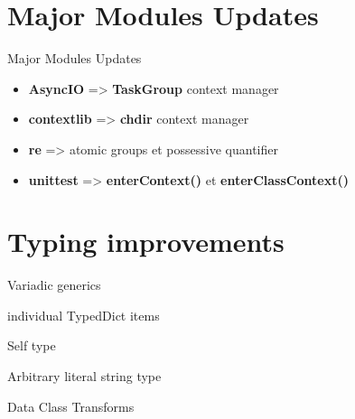 \documentclass[aspectratio=169, xetex, 12pt]{beamer}
\begin{document}
    \section{Major Modules Updates}
    \begin{frame}{Major Modules Updates}
        \begin{block}{}
            \begin{itemize}
                \item \textbf{AsyncIO} => \textbf{TaskGroup} context manager
                \item \textbf{contextlib} => \textbf{chdir} context manager
                \item \textbf{re} => atomic groups et possessive quantifier
                \item \textbf{unittest} => \textbf{enterContext()} et \textbf{enterClassContext()}
            \end{itemize}
        \end{block}
    \end{frame}

    \section{Typing improvements}

    \begin{frame}{Variadic generics}
    \end{frame}

    \begin{frame}{individual TypedDict items}
    \end{frame}

    \begin{frame}{Self type}
    \end{frame}

    \begin{frame}{Arbitrary literal string type}
    \end{frame}

    \begin{frame}{Data Class Transforms}
    \end{frame}
\end{document}
